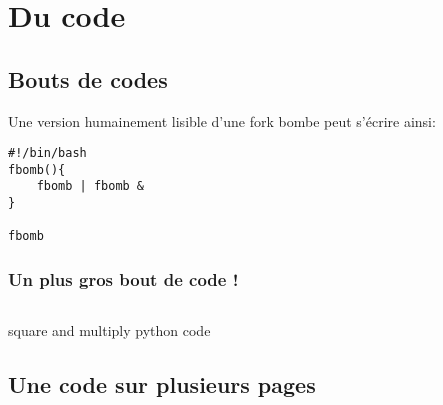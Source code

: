 \section{Du code}
\subsection{Bouts de codes}
Une version humainement lisible d'une fork bombe peut s'écrire ainsi:
\begin{verbatim}
#!/bin/bash
fbomb(){
    fbomb | fbomb &
}

fbomb
\end{verbatim}

\subsubsection{Un plus gros bout de code !}
\begin{listing}[H]
    \inputminted{python}{src/parts/code/example.py}
    \caption{square and multiply python code}
    \label{cd:square_and_mult}
\end{listing}

\subsection{Une code sur plusieurs pages}
\inputminted{python}{src/parts/code/example2.py}



